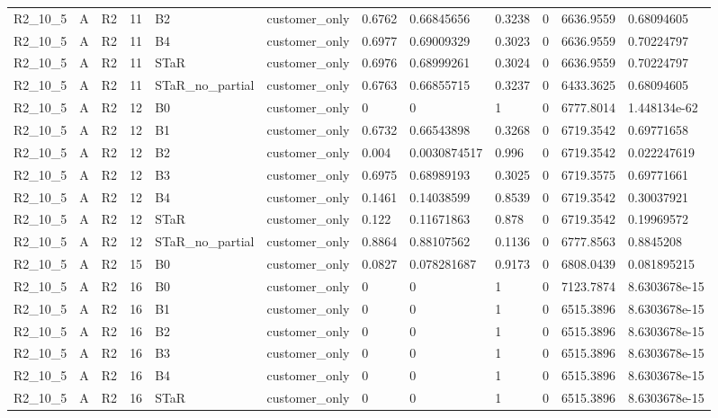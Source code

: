 \begin{longtable}{llllllllllll}
R2\_10\_5 & A & R2 & 11 & B2 & customer\_only & 0.6762 & 0.66845656 & 0.3238 & 0 & 6636.9559 & 0.68094605 \\
R2\_10\_5 & A & R2 & 11 & B4 & customer\_only & 0.6977 & 0.69009329 & 0.3023 & 0 & 6636.9559 & 0.70224797 \\
R2\_10\_5 & A & R2 & 11 & STaR & customer\_only & 0.6976 & 0.68999261 & 0.3024 & 0 & 6636.9559 & 0.70224797 \\
R2\_10\_5 & A & R2 & 11 & STaR\_no\_partial & customer\_only & 0.6763 & 0.66855715 & 0.3237 & 0 & 6433.3625 & 0.68094605 \\
R2\_10\_5 & A & R2 & 12 & B0 & customer\_only & 0 & 0 & 1 & 0 & 6777.8014 & 1.448134e-62 \\
R2\_10\_5 & A & R2 & 12 & B1 & customer\_only & 0.6732 & 0.66543898 & 0.3268 & 0 & 6719.3542 & 0.69771658 \\
R2\_10\_5 & A & R2 & 12 & B2 & customer\_only & 0.004 & 0.0030874517 & 0.996 & 0 & 6719.3542 & 0.022247619 \\
R2\_10\_5 & A & R2 & 12 & B3 & customer\_only & 0.6975 & 0.68989193 & 0.3025 & 0 & 6719.3575 & 0.69771661 \\
R2\_10\_5 & A & R2 & 12 & B4 & customer\_only & 0.1461 & 0.14038599 & 0.8539 & 0 & 6719.3542 & 0.30037921 \\
R2\_10\_5 & A & R2 & 12 & STaR & customer\_only & 0.122 & 0.11671863 & 0.878 & 0 & 6719.3542 & 0.19969572 \\
R2\_10\_5 & A & R2 & 12 & STaR\_no\_partial & customer\_only & 0.8864 & 0.88107562 & 0.1136 & 0 & 6777.8563 & 0.8845208 \\
R2\_10\_5 & A & R2 & 15 & B0 & customer\_only & 0.0827 & 0.078281687 & 0.9173 & 0 & 6808.0439 & 0.081895215 \\
R2\_10\_5 & A & R2 & 16 & B0 & customer\_only & 0 & 0 & 1 & 0 & 7123.7874 & 8.6303678e-15 \\
R2\_10\_5 & A & R2 & 16 & B1 & customer\_only & 0 & 0 & 1 & 0 & 6515.3896 & 8.6303678e-15 \\
R2\_10\_5 & A & R2 & 16 & B2 & customer\_only & 0 & 0 & 1 & 0 & 6515.3896 & 8.6303678e-15 \\
R2\_10\_5 & A & R2 & 16 & B3 & customer\_only & 0 & 0 & 1 & 0 & 6515.3896 & 8.6303678e-15 \\
R2\_10\_5 & A & R2 & 16 & B4 & customer\_only & 0 & 0 & 1 & 0 & 6515.3896 & 8.6303678e-15 \\
R2\_10\_5 & A & R2 & 16 & STaR & customer\_only & 0 & 0 & 1 & 0 & 6515.3896 & 8.6303678e-15 \\

\end{longtable}
